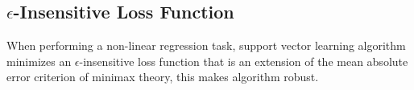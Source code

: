 \documentclass[12pt]{article}
\begin{document}
\subsection{$\epsilon$-Insensitive Loss Function}

When performing a non-linear regression task, support vector learning algorithm minimizes an $\epsilon$-insensitive loss function that is an extension of the mean absolute error criterion of minimax theory, this makes algorithm robust.
\end{document}
